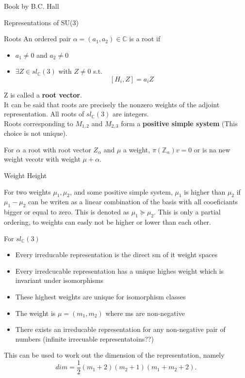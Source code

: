 \documentclass[12pt, letterpaper]{article}
\newcommand{\C}{\mathbb{C}}
\newcommand{\Z}{\mathbb{Z}}
\begin{document}
\begin{section}{Book by B.C. Hall}
\begin{subsection}{Representations of SU(3)}
\begin{subsubsection}{Roots}
      An ordered pair \(\alpha = (a_{1}, a_{2}) \in \C\) is a root if
      \begin{itemize}
        \item \(a_{1} \neq 0\) and \(a_{2} \neq 0\)
        \item \(\exists Z \in sl_{\C}(3)\) with \(Z \neq 0\)
              s.t.\ \[[H_{i}, Z] = a_{i} Z\]
      \end{itemize}
      Z is called a \textbf{root vector}. \\
      It can be said that roots are precisely the nonzero weights of the adjoint
      representation. All roots of \(sl_{\C}(3)\) are integers. \\
      Roots corresponding to \(M_{1,2}\) and \(M_{2,3}\) form a \textbf{positive
        simple system} (This choice is not unique).

      For \(\alpha\) a root with root vector \(Z_{\alpha}\) and \(\mu\) a
      weight, \(\pi(\Z_{\alpha})v = 0\) or is na new weight vecotr with weight
      \(\mu + \alpha\).

    \end{subsubsection}

    \begin{subsubsection}{Weight Height}

      For two weights \(\mu_{1}, \mu_{2}\), and some positive simple system,
      \(\mu_{1}\) is higher than \(\mu_{2}\) if \(\mu_{1} - \mu_{2}\) can be
      writen as a linear combination of the basis with all cooeficiants bigger
      or equal to zero. This is denoted as \(\mu_{1} \succeq \mu_{2}\). This is
      only a partial ordering, to weights can easly not be higher or lower than
      each other.

      For \(sl_{\C}(3)\)
      \begin{itemize}
        \item Every irreducable representation is the direct sm of it weight
              spaces
        \item  Every irredcucable representation has a unique highes weight
              which is invariant under isomorphisms
        \item These highest weights are unique for isomorphism classes
        \item The weight is \(\mu = (m_{1}, m_{2})\) where ms are non-negative
        \item There exists an irreducable representation for any non-negative
              pair of numbers (infinite irrecuable representatoins??)
      \end{itemize}
      This can be used to work out the dimension of the representation,
      namely \[dim = \frac{1}{2} (m_{1} +2)(m_{2} + 1)(m_{1} + m_{2} + 2).\]


\end{subsubsection}
\end{subsection}
\end{section}
\end{document}
